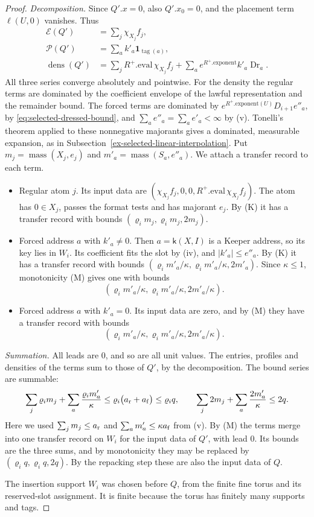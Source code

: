 \begin{proof}
\emph{Decomposition.} Since $Q'.x=0$, also $Q'.x_0=0$, and the placement
term $\ell(U,0)$ vanishes. Thus
\[
 \begin{aligned}
 \mathcal E(Q')&=\sum_j\chi_{X_j}f_j,\\
 \mathcal P(Q')&=\sum_a k'_a\mathbf 1_{\operatorname{tag}(a)},\\
 \operatorname{dens}(Q')&=\sum_jR^+.\mathrm{eval}\,\chi_{X_j}f_j
   +\sum_ae^{R^+.\mathrm{exponent}}k'_a\operatorname{Dr}_a .
 \end{aligned}
\]
All three series converge absolutely and pointwise. For the density the
regular terms are dominated by the coefficient envelope of the lawful
representation and the remainder bound. The forced terms are dominated
by $e^{R^+.\mathrm{exponent}(U)}D_{i+1}e''_a$, by
\eqref{eq:selected-dressed-bound}, and $\sum_ae''_a=\sum_ae'_a<\infty$
by (v). Tonelli's
theorem applied to these nonnegative majorants gives a dominated,
measurable expansion, as in
Subsection~\ref{ex-selected-linear-interpolation}. Put
$m_j=\operatorname{mass}(X_j,e_j)$ and
$m'_a=\operatorname{mass}(S_a,e''_a)$. We attach a transfer record to each term.
\begin{itemize}
\item Regular atom $j$. Its input data are
  $(\chi_{X_j}f_j,0,0,R^+.\mathrm{eval}\,\chi_{X_j}f_j)$. The atom has
  $0\in X_j$, passes the format tests and has majorant $e_j$. By (K) it
  has a transfer record with bounds $(\varrho_im_j,\varrho_im_j,2m_j)$.
\item Forced address $a$ with $k'_a\ne0$. Then $a=\mathsf k(X,I)$ is a
  Keeper address, so its key lies in $W_i$. Its coefficient fits the
  slot by (iv), and $|k'_a|\le e''_a$. By (K) it has a transfer record with
  bounds $(\varrho_im'_a/\kappa,\varrho_im'_a/\kappa,2m'_a)$. Since
  $\kappa\le1$, monotonicity (M) gives one with bounds
  \[
 (\varrho_im'_a/\kappa,\varrho_im'_a/\kappa,2m'_a/\kappa).
\]
\item Forced address $a$ with $k'_a=0$. Its input data are zero, and
  by (M) they have a transfer record with bounds
  \[
 (\varrho_im'_a/\kappa,\varrho_im'_a/\kappa,2m'_a/\kappa).
\]
\end{itemize}

\emph{Summation.} All leads are $0$, and so are all unit values. The
entries, profiles and densities of the terms sum to those of $Q'$, by
the decomposition. The bound series are summable:
\[
 \sum_j\varrho_im_j+\sum_a\frac{\varrho_im'_a}{\kappa}
 \le\varrho_i\bigl(a_{\rm r}+a_{\rm f}\bigr)\le\varrho_iq,
 \qquad
 \sum_j2m_j+\sum_a\frac{2m'_a}{\kappa}\le2q .
\]
Here we used $\sum_jm_j\le a_{\rm r}$ and
$\sum_am'_a\le\kappa a_{\rm f}$ from (v). By (M) the terms merge into
one transfer record on $W_i$ for the input data of $Q'$, with lead $0$. Its
bounds are the three sums, and by monotonicity they may be replaced by
$(\varrho_iq,\varrho_iq,2q)$. By the repacking step these are also the
input data of $Q$.

The insertion support $W_i$ was chosen before $Q$, from the finite fine torus and
its reserved-slot assignment. It is finite because the torus has finitely many supports
and tags.
\end{proof}

